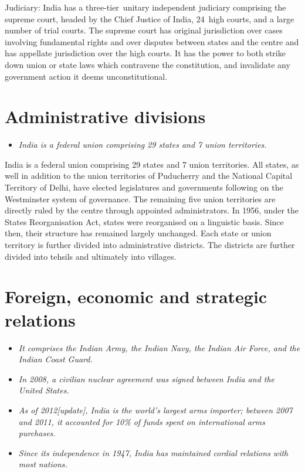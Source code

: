 Judiciary: India has a three-tier~unitary independent judiciary
comprising the supreme court, headed by the Chief Justice of India,
24~high courts, and a large number of trial courts. The supreme court
has original jurisdiction over cases involving fundamental rights and
over disputes between states and the centre and has appellate
jurisdiction over the high courts. It has the power to both strike down
union or state laws which contravene the constitution, and invalidate
any government action it deems unconstitutional.

\section{Administrative divisions}\label{administrative-divisions}

\begin{itemize}
\item
  \emph{India is a federal union comprising 29 states and 7 union
  territories.}
\end{itemize}

India is a federal union comprising 29 states and 7 union territories.
All states, as well in addition to the union territories of Puducherry
and the National Capital Territory of Delhi, have elected legislatures
and governments following on the Westminster system of governance. The
remaining five union territories are directly ruled by the centre
through appointed administrators. In 1956, under the States
Reorganisation Act, states were reorganised on a linguistic basis. Since
then, their structure has remained largely unchanged. Each state or
union territory is further divided into administrative districts. The
districts are further divided into tehsils and ultimately into villages.

\section{Foreign, economic and strategic
relations}\label{foreign-economic-and-strategic-relations}

\begin{itemize}
\item
  \emph{It comprises the Indian Army, the Indian Navy, the Indian Air
  Force, and the Indian Coast Guard.}
\item
  \emph{In 2008, a civilian nuclear agreement was signed between India
  and the United States.}
\item
  \emph{As of 2012{[}update{]}, India is the world's largest arms
  importer; between 2007 and 2011, it accounted for 10\% of funds spent
  on international arms purchases.}
\item
  \emph{Since its independence in 1947, India has maintained cordial
  relations with most nations.}
\end{itemize}

